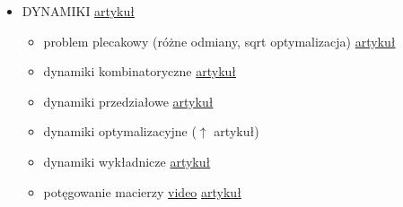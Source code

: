 \documentclass[15pt]{article}
\begin{document}
\begin{itemize}
    \item DYNAMIKI \href{http://kompendium.meetit.pl/kurs#meth3}{artykuł}
    \begin{itemize}
        \item problem plecakowy (różne odmiany, sqrt optymalizacja) \href{http://kompendium.meetit.pl/kurs#dp1}{artykuł}
        \item dynamiki kombinatoryczne \href{http://kompendium.meetit.pl/kurs#dp2}{artykuł}
        \item dynamiki przedziałowe \href{http://kompendium.meetit.pl/kurs#dp3}{artykuł}
        \item dynamiki optymalizacyjne ($\uparrow$ artykuł)
        \item dynamiki wykładnicze \href{http://kompendium.meetit.pl/kurs#dp4}{artykuł}
        \item potęgowanie macierzy \href{http://was.zaa.mimuw.edu.pl/?q=node/35}{video} \href{http://kompendium.meetit.pl/kurs#dp5}{artykuł}
    \end{itemize}
    

\end{itemize}
\end{document}
